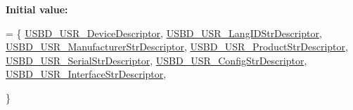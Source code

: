 {\bfseries Initial value\-:}
\begin{DoxyCode}
=
\{
  \hyperlink{group__USBD__DESC__Private__Functions_gadd5d311559f5cf53f393f9b863bd8aae}{USBD\_USR\_DeviceDescriptor},
  \hyperlink{group__USBD__DESC__Private__Functions_gab5247caa36187728a45c43078d96497e}{USBD\_USR\_LangIDStrDescriptor}, 
  \hyperlink{group__USBD__DESC__Private__Functions_gaeb4b6e96436cb53ade2b8276568c27d1}{USBD\_USR\_ManufacturerStrDescriptor},
  \hyperlink{group__USBD__DESC__Private__Functions_ga3e9f418a2337898da999ca7548c414a9}{USBD\_USR\_ProductStrDescriptor},
  \hyperlink{group__USBD__DESC__Private__Functions_ga61caa6dd47de36f32d25e2d6980e5904}{USBD\_USR\_SerialStrDescriptor},
  \hyperlink{group__USBD__DESC__Private__Functions_ga1a95bda8d761cd993c82234e043270fc}{USBD\_USR\_ConfigStrDescriptor},
  \hyperlink{group__USBD__DESC__Private__Functions_gaf7003c494f598dd781416da3e468e615}{USBD\_USR\_InterfaceStrDescriptor},
  
\}
\end{DoxyCode}
